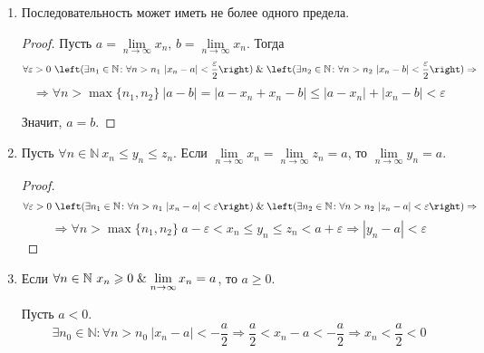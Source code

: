 \begin{enumerate}
	\item Последовательность может иметь не более одного предела.
	\begin{proof}
	Пусть $a = \lim\limits_{n \to \infty} x_n$, $b = \lim\limits_{n \to \infty} x_n$.
	Тогда
	\begin{equation*}
	\forall \varepsilon > 0 \
	\left( \exists n_1 \in \mathbb N \colon \forall n > n_1 \ |x_n - a| < \frac\varepsilon2 \right) \lAnd
	\left( \exists n_2 \in \mathbb N \colon \forall n > n_2 \ |x_n - b| < \frac\varepsilon2 \right) \Rightarrow
	\end{equation*}
	\begin{equation*}
	\Rightarrow \forall n > \max \{ n_1, n_2 \} \ |a - b| = |a - x_n + x_n - b| \leqslant |a - x_n| + |x_n - b| < \varepsilon
	\end{equation*}
	
	Значит, $a = b$.
	\end{proof}
	
	\item \begin{theorem}
	Пусть $\forall n \in \mathbb N \ x_n \leqslant y_n \leqslant z_n$.
	Если $\lim\limits_{n \to \infty} x_n = \lim\limits_{n \to \infty} z_n = a$, то $\lim\limits_{n \to \infty} y_n = a$.
	\end{theorem}
	\begin{proof}
	\begin{equation*}
	\forall \varepsilon > 0 \
	\left( \exists n_1 \in \mathbb N \colon \forall n > n_1 \ |x_n - a| < \varepsilon \right) \lAnd
	\left( \exists n_2 \in \mathbb N \colon \forall n > n_2 \ |z_n - a| < \varepsilon \right) \Rightarrow
	\end{equation*}
	\begin{equation*}
	\Rightarrow \forall n > \max \{ n_1, n_2 \} \ a - \varepsilon < x_n \leqslant y_n \leqslant z_n < a + \varepsilon \Rightarrow |y_n - a| < \varepsilon
	\end{equation*}
	\end{proof}
	
	\item Если $\forall n \in \mathbb N \ x_n \geqslant 0 \mathrel{\&} \lim\limits_{n \to \infty} x_n = a$, то $a \geqslant 0$.
	\begin{proofcontra}
	Пусть $a < 0$.
	\begin{equation*}
	\exists n_0 \in \mathbb N \colon \forall n > n_0 \ |x_n - a| < -\frac{a}2 \Rightarrow
	\frac{a}2 < x_n - a < -\frac{a}2 \Rightarrow
	x_n < \frac{a}2 < 0
	\end{equation*}
	

\end{proofcontra}
\end{enumerate}
